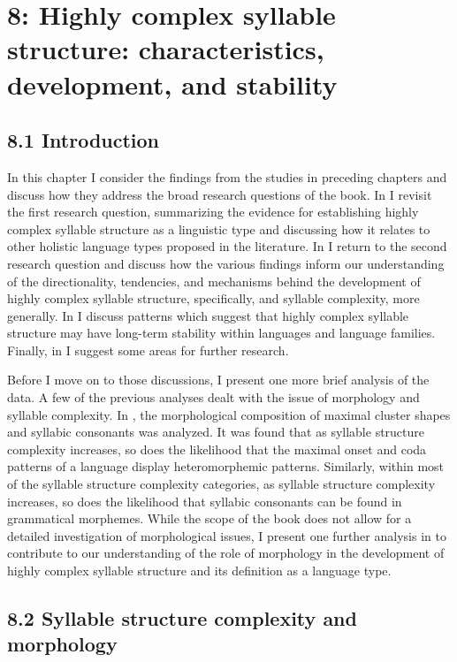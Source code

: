 \chapter{8: Highly complex syllable structure: characteristics, development, and stability}
\section{8.1 Introduction}

  In this chapter I consider the findings from the studies in preceding chapters and discuss how they address the broad research questions of the book. In  I revisit the first research question, summarizing the evidence for establishing highly complex syllable structure as a linguistic type and discussing how it relates to other holistic language types proposed in the literature. In  I return to the second research question and discuss how the various findings inform our understanding of the directionality, tendencies, and mechanisms behind the development of highly complex syllable structure, specifically, and syllable complexity, more generally. In  I discuss patterns which suggest that highly complex syllable structure may have long-term stability within languages and language families. Finally, in  I suggest some areas for further research.

  Before I move on to those discussions, I present one more brief analysis of the data. A few of the previous analyses dealt with the issue of morphology and syllable complexity. In  , the morphological composition of maximal cluster shapes and syllabic consonants was analyzed. It was found that as syllable structure complexity increases, so does the likelihood that the maximal onset and coda patterns of a language display heteromorphemic patterns. Similarly, within most of the syllable structure complexity categories, as syllable structure complexity increases, so does the likelihood that syllabic consonants can be found in grammatical morphemes. While the scope of the book does not allow for a detailed investigation of morphological issues, I present one further analysis in  to contribute to our understanding of the role of morphology in the development of highly complex syllable structure and its definition as a language type.

\section{8.2 Syllable structure complexity and morphology}

